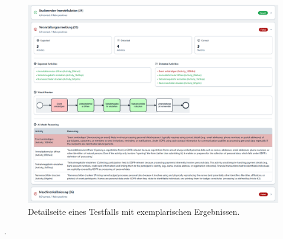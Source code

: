 \begin{figure}
    \centering
    \includegraphics[height=.55\textheight]{images/evaluation/evaluation-result-by-testcase}
    \caption{Detailseite eines Testfalls mit exemplarischen Ergebnissen.}
    \label{fig:evaluation-by-testcase}
\end{figure}.
